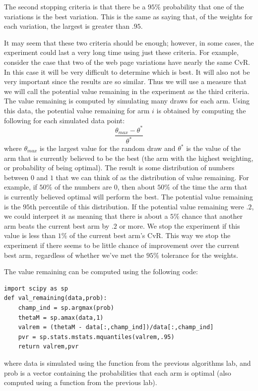 The second stopping criteria is that there be a $95\%$ probability that one of the variations is the best variation.
This is the same as saying that, of the weights for each variation, the largest is greater than $.95$.

It may seem that these two criteria should be enough; however, in some cases, the
experiment could last a very long time using just these criteria.
For example, consider the case that two of the web page variations have nearly the same CvR.
In this case it will be very difficult to determine which is best.
It will also not be very important since the results are so similar.
Thus we will use a measure that we will call the potential value remaining
in the experiment as the third criteria.  The value remaining is computed by
simulating many draws for each arm.  Using this data, the potential value remaining
for arm $i$ is obtained by computing the following for each simulated data point:
\begin{equation}\label{valrem}
\frac{\theta_{max} - \theta^*}{\theta^*}
\end{equation}
where $\theta_{max}$ is the largest value for the random draw and $\theta^*$ is the
value of the arm that is currently believed to be the best
(the arm with the highest weighting, or probability of being optimal).
The result is some distribution of numbers between $0$ and $1$ that we can think
of as the distribution of value remaining.  For example, if $50\%$ of the numbers are 0,
then about $50\%$ of the time the arm that is currently believed optimal will perform the best.
The potential value remaining is the $95$th percentile of this distribution.
If the potential value remaining were $.2$, we could interpret it as meaning
that there is about a $5\%$ chance that another arm beats the current best arm by $.2$ or more.
We stop the experiment if this value is less than $1\%$ of the current best arm's CvR.
This way we stop the experiment if there seems to be little chance of improvement over
the current best arm, regardless of whether we've met the $95\%$ tolerance for the weights.

The value remaining can be computed using the following code:
\begin{lstlisting}
import scipy as sp
def val_remaining(data,prob):
    champ_ind = sp.argmax(prob)
    thetaM = sp.amax(data,1)
    valrem = (thetaM - data[:,champ_ind])/data[:,champ_ind]
    pvr = sp.stats.mstats.mquantiles(valrem,.95)
    return valrem,pvr
\end{lstlisting}
where data is simulated using the  function from the previous algorithms lab,
and prob is a vector containing the probabilities that each arm is optimal
(also computed using a function from the previous lab).


